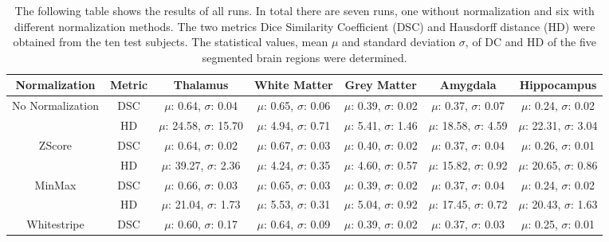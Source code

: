 \documentclass[journal]{IEEEtran}
\begin{document}
\onecolumn
\begin{table}[!ht]
	\caption{The following table shows the results of all runs. In total there are seven runs, one without normalization and six with different normalization methods. The two metrics Dice Similarity Coefficient (DSC) and Hausdorff distance (HD) were obtained from the ten test subjects. The statistical values, mean $\mu$ and standard deviation $\sigma$, of DC and HD of the five segmented brain regions were determined.}
	\label{tab:diceHD}
	\begin{center}
	\begin{threeparttable}
	\begin{tabular}{c c c c c c c}
		\toprule
			\textbf{Normalization} & \textbf{Metric} &  \textbf{Thalamus} & \textbf{White Matter} & \textbf{Grey Matter} & \textbf{Amygdala} & \textbf{Hippocampus} \\ \midrule
		No Normalization		&	DSC	&	$\mu$: 0.64, $\sigma$: 0.04		&	$\mu$: 0.65, $\sigma$: 0.06		&	$\mu$: 0.39, $\sigma$: 0.02		&	$\mu$: 0.37, $\sigma$: 0.07		&	$\mu$: 0.24, $\sigma$: 0.02		\\ \cmidrule(lr{1em}){2-7}
								&	HD	&	$\mu$: 24.58, $\sigma$: 15.70	&	$\mu$: 4.94, $\sigma$: 0.71		&	$\mu$: 5.41, $\sigma$: 1.46		&	$\mu$: 18.58, $\sigma$: 4.59	&	$\mu$: 22.31, $\sigma$: 3.04	\\ \midrule
		ZScore					&	DSC	&	$\mu$: 0.64, $\sigma$: 0.02		&	$\mu$: 0.67, $\sigma$: 0.03		&	$\mu$: 0.40, $\sigma$: 0.02		&	$\mu$: 0.37, $\sigma$: 0.04		&	$\mu$: 0.26, $\sigma$: 0.01 	\\ \cmidrule(lr{1em}){2-7}
								&	HD	&	$\mu$: 39.27, $\sigma$: 2.36	&	$\mu$: 4.24, $\sigma$: 0.35		&	$\mu$: 4.60, $\sigma$: 0.57		&	$\mu$: 15.82, $\sigma$: 0.92	&	$\mu$: 20.65, $\sigma$: 0.86 	\\ \midrule
		MinMax 					&	DSC	&	$\mu$: 0.66, $\sigma$: 0.03		&	$\mu$: 0.65, $\sigma$: 0.03		&	$\mu$: 0.39, $\sigma$: 0.02		&	$\mu$: 0.37, $\sigma$: 0.04		&	$\mu$: 0.24, $\sigma$: 0.02 	\\ \cmidrule(lr{1em}){2-7}
								&	HD	&	$\mu$: 21.04, $\sigma$: 1.73	&	$\mu$: 5.53, $\sigma$: 0.31		&	$\mu$: 5.04, $\sigma$: 0.92		&	$\mu$: 17.45, $\sigma$: 0.72	&	$\mu$: 20.43, $\sigma$: 1.63 	\\ \midrule
		Whitestripe 			&	DSC	&	$\mu$: 0.60, $\sigma$: 0.17		&	$\mu$: 0.64, $\sigma$: 0.09		&	$\mu$: 0.39, $\sigma$: 0.02		&	$\mu$: 0.37, $\sigma$: 0.03		&	$\mu$: 0.25, $\sigma$: 0.01 	\\ \cmidrule(lr{1em}){2-7}

\end{tabular}
\end{threeparttable}
\end{center}
\end{table}
\end{document}
